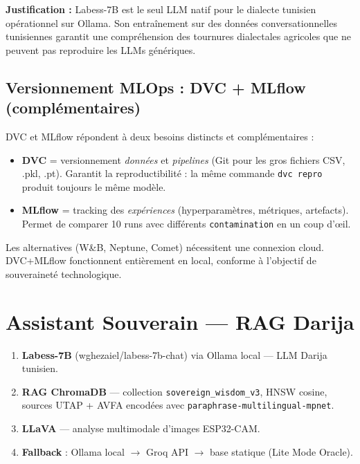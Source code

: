 \documentclass[12pt,a4paper,oneside]{report}
\newcommand{\code}[1]{\texttt{\small\color{farmgray}#1}}
\begin{document}
\noindent\textbf{Justification :} Labess-7B est le seul LLM natif pour le dialecte
tunisien opérationnel sur Ollama. Son entraînement sur des données conversationnelles
tunisiennes garantit une compréhension des tournures dialectales agricoles que ne
peuvent pas reproduire les LLMs génériques.

\subsection{Versionnement MLOps : DVC + MLflow (complémentaires)}

DVC et MLflow répondent à deux besoins distincts et complémentaires :
\begin{itemize}
  \item \textbf{DVC} = versionnement \textit{données} et \textit{pipelines} (Git pour
        les gros fichiers CSV, .pkl, .pt). Garantit la reproductibilité : la même
        commande \code{dvc repro} produit toujours le même modèle.
  \item \textbf{MLflow} = tracking des \textit{expériences} (hyperparamètres, métriques,
        artefacts). Permet de comparer 10 runs avec différents \code{contamination} en
        un coup d'œil.
\end{itemize}
Les alternatives (W\&B, Neptune, Comet) nécessitent une connexion cloud. DVC+MLflow
fonctionnent entièrement en local, conforme à l'objectif de souveraineté technologique.

\section{Assistant Souverain — RAG Darija}

\begin{tcolorbox}[technote,title={Architecture de l'assistant}]
\begin{enumerate}
  \item \textbf{Labess-7B} (wghezaiel/labess-7b-chat) via Ollama local — LLM Darija tunisien.
  \item \textbf{RAG ChromaDB} — collection \texttt{sovereign\_wisdom\_v3}, HNSW cosine,
        sources UTAP + AVFA encodées avec \texttt{paraphrase-multilingual-mpnet}.
  \item \textbf{LLaVA} — analyse multimodale d'images ESP32-CAM.
  \item \textbf{Fallback} : Ollama local $\to$ Groq API $\to$ base statique (Lite Mode Oracle).
\end{enumerate}
\end{tcolorbox}
\end{document}
